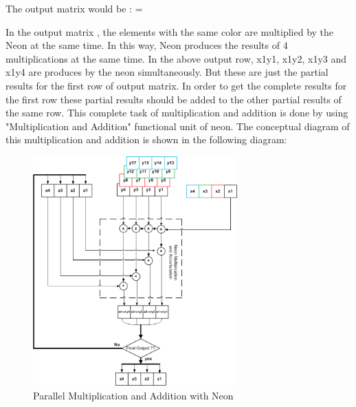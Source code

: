 The output matrix would be : 
=
\begin{table}[h]
\end{table}

In the output matrix ,  the  elements with the same color are multiplied by the Neon at the same time. In this way, Neon produces the results of 4 multiplications at the same time.  In the above output row, x1y1, x1y2, x1y3 and x1y4 are produces by the neon simultaneously.  But these are just the partial results for the first row of output matrix. In order to get the complete results for the first row these partial results should be added to the other partial results  of the same row.  This complete task of multiplication and addition is done by using "Multiplication and Addition" functional unit of neon. The conceptual diagram of this multiplication and addition is shown in the following diagram:
\begin{figure}[h]
\centering 
\includegraphics[width= 0.7\textwidth]{images/MandA}
\caption{Parallel Multiplication and Addition with Neon  }
\label{Multiplication and Addition}
\end{figure}
